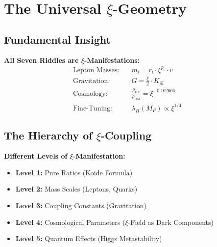 	\section{The Universal $\xi$-Geometry}
	\subsection{Fundamental Insight}
	\textbf{All Seven Riddles are $\xi$-Manifestations:}
	\begin{align}
		\text{Lepton Masses:} &\quad m_i = r_i \cdot \xi^{p_i} \cdot v \\
		\text{Gravitation:} &\quad G = \frac{\xi}{2} \cdot K_{\text{SI}} \\
		\text{Cosmology:} &\quad \frac{\rho_{\text{DE}}}{\rho_{\text{DM}}} = \xi^{-0.102666} \\
		\text{Fine-Tuning:} &\quad \lambda_H(M_P) \propto \xi^{1/4}
	\end{align}
	\subsection{The Hierarchy of $\xi$-Coupling}
	\textbf{Different Levels of $\xi$-Manifestation:}
	\begin{itemize}
		\item \textbf{Level 1:} Pure Ratios (Koide Formula)
		\item \textbf{Level 2:} Mass Scales (Leptons, Quarks)
		\item \textbf{Level 3:} Coupling Constants (Gravitation)
		\item \textbf{Level 4:} Cosmological Parameters ($\xi$-Field as Dark Components)
		\item \textbf{Level 5:} Quantum Effects (Higgs Metastability)
	\end{itemize}
